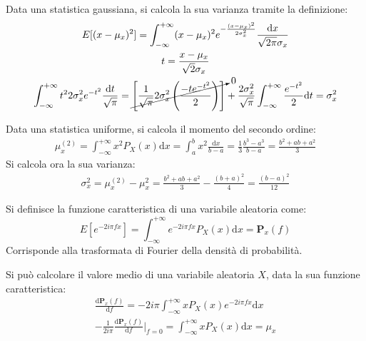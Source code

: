 \documentclass{article}
\newcommand{\df}{\mathrm{d}}
\numberwithin{equation}{subsection}
\begin{document}
Data una statistica gaussiana, si calcola la sua varianza tramite la definizione:
\begin{gather*}
    E[(x-\mu_x)^2]=\displaystyle\int_{-\infty}^{+\infty}(x-\mu_x)^2e^{-\frac{(x-\mu_x)^2}{2\sigma_x^2}}\frac{\df x}{\sqrt{2\pi}\sigma_x}\\
    t=\displaystyle\frac{x-\mu_x}{\sqrt{2}\sigma_x}\\
    \displaystyle\int_{-\infty}^{+\infty}t^22\sigma_x^2e^{-t^2}\frac{\df t}{\sqrt{\pi}}=\cancelto{0}{\left[\frac{1}{\sqrt{\pi}}2\sigma_x^2\left(\frac{-te^{-t^2}}{2}\right)\right]}+\frac{2\sigma_x^2}{\sqrt{\pi}}\int_{-\infty}^{+\infty}\frac{e^{-t^2}}{2}\df t=\sigma_x^2
\end{gather*}


Data una statistica uniforme, si calcola il momento del secondo ordine:
\begin{gather}
    \mu_x^{(2)}=\displaystyle\int_{-\infty}^{+\infty}x^2P_X(x)\df x=\int_a^bx^2\frac{\df x}{b-a}=\frac{1}{3}\frac{b^3-a^3}{b-a}=\frac{b^2+ab+a^2}{3}
\end{gather}
Si calcola ora la sua varianza:
\begin{gather}
    \sigma_x^2=\mu_x^{(2)}-\mu_x^2=\displaystyle\frac{b^2+ab+a^2}{3}-\frac{(b+a)^2}{4}=\frac{(b-a)^2}{12}
\end{gather}



Si definisce la funzione caratteristica di una variabile aleatoria come:
\begin{equation}
    E\left[e^{-2i\pi fx}\right]=\displaystyle\int_{-\infty}^{+\infty}e^{-2i\pi fx}P_X(x)\df x=\mathbf{P}_x(f)
\end{equation}
Corrisponde alla trasformata di Fourier della densità di probabilità. 

Si può calcolare il valore medio di una variabile aleatoria $X$, data la sua funzione caratteristica:
\begin{gather*}
    \displaystyle\frac{\df\mathbf{P}_x(f)}{\df f}=-2i\pi\int_{-\infty}^{+\infty}xP_X(x)e^{-2i\pi fx}\df x\\
    \displaystyle-\frac{1}{2i\pi}\frac{\df\mathbf{P}_x(f)}{\df f}\bigg|_{f=0}=\int_{-\infty}^{+\infty}xP_X(x)\df x=\mu_x
\end{gather*}
\end{document}
